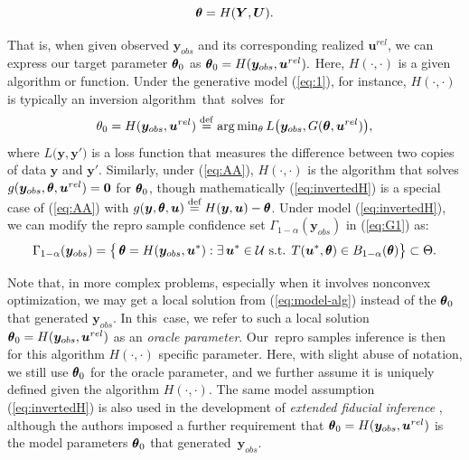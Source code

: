 \documentclass[12pt]{article}
\theoremstyle{shortspace}
\def\*#1{\bm{#1}}
\def\btheta{\mathop{\theta\kern-.45em\hbox{$\theta$}}\nolimits}
\begin{document}
\vspace{-4mm}
\begin{equation}
\label{eq:invertedH}
\btheta
= H(\*Y,\*U).
\end{equation}

\vspace{-2mm} \noindent
That is, when given observed $\*y_{obs}$ and its corresponding realized $\*u^{rel}$, we can express our target parameter $\btheta_0$ as $\btheta_0 = H(\*y_{obs}, \*u^{rel}).$
Here, $H(\cdot, \cdot)$ is a given algorithm or function. Under the generative model (\ref{eq:1}), for instance, 
$H(\cdot,\cdot)$ is typically an inversion  algorithm~that~solves~for 
\begin{equation}
\theta_0 = H(\*y_{obs}, \*u^{rel}) \overset{\rm def}{=} \arg \min\nolimits_{\theta} L\big(\*y_{obs}, G(\*\theta, \*u^{rel})\big),
    \label{eq:model-alg}
\end{equation}
where $L\big(\*y, \*y'\big)$ is a loss function that measures the difference between two copies of data $\*y$ and $\*y'$. Similarly, under (\ref{eq:AA}), 
$H(\cdot, \cdot)$ is the algorithm that solves $g(\*y_{obs}, \btheta, \*u^{rel}) = \*0$ for $\btheta_0$, though mathematically (\ref{eq:invertedH}) is a special case of (\ref{eq:AA}) with $g(\*y, \btheta, \*u) \overset{\text{def}}{=} H(\*y, \*u) - \btheta$. 
Under model (\ref{eq:invertedH}), we can modify the repro sample confidence set $\Gamma_{1-\alpha}(\*y_{obs})$ in (\ref{eq:G1}) as: %
\begin{eqnarray}
\label{eq:G2h}
\Gamma_{1-\alpha}(\*y_{obs}) = \big\{\btheta = H(\*y_{obs}, \*u^*):  \exists 
\,\*u^* \in {\mathcal U} \mbox{ s.t. } 
  T(\*u^*, \btheta)  \in B_{1 - \alpha}(\btheta)
\big\} \subset \Theta.
\end{eqnarray}

Note that, in more complex problems, especially when it involves nonconvex optimization, we may get a local solution from (\ref{eq:model-alg}) instead of the $\btheta_0$ that generated $\*y_{obs}$.
In this~case, we refer to such a local solution $\btheta_0 = H(\*y_{obs}, \*u^{rel})$ as an {\it oracle parameter}. Our~repro samples inference is then for this algorithm $H(\cdot, \cdot)$ specific parameter. Here, with slight abuse of notation, we still use $\btheta_0$ for the oracle parameter, and we further assume it is uniquely defined given the algorithm $H(\cdot, \cdot)$. 
The same model assumption  (\ref{eq:invertedH}) is also used in the development of {\it extended fiducial inference} \citep{liang2025extended}, although the authors imposed a further requirement that $\btheta_0 = H(\*y_{obs}, \*u^{rel})$ is the model parameters $\btheta_0$ that generated~$\*y_{obs}$.
\end{document}
